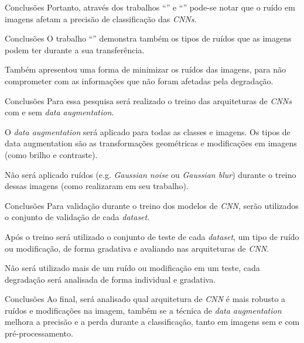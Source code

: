 \begin{frame}{Conclusões}
    Portanto, através dos trabalhos ``\textit{}'' e ``\textit{}'' pode-se notar que o ruído em imagens afetam a precisão de classificação das \textit{CNNs}. 
\end{frame}

\begin{frame}{Conclusões}
    O trabalho ``\textit{}'' demonstra também os tipos de ruídos que as imagens podem ter durante a sua transferência. 
    \vspace{1em}

    Também apresentou uma forma de minimizar os ruídos das imagens, para não comprometer com as informações
que não foram afetadas pela degradação.
\end{frame}

\begin{frame}{Conclusões}
    Para essa pesquisa será realizado o treino das arquiteturas de \textit{CNNs} com e sem \textit{data augmentation}. 
    
    \vspace{1em}
    O \textit{data augmentation} será aplicado para todas as classes e imagens. Os tipos de data augmentation são as transformações geométricas e modificações em imagens (como brilho e contraste). 
    
    \vspace{1em}
    Não será aplicado ruídos (e.g. \textit{Gaussian noise} ou \textit{Gaussian blur}) durante o treino dessas imagens (como \textcite{10.1007/978-3-319-75193-1_50} realizaram em seu trabalho).
\end{frame}

\begin{frame}{Conclusões}
    Para validação durante o treino dos modelos de \textit{CNN}, serão utilizados o conjunto de validação de cada \textit{dataset}. 
    
    \vspace{1em}
    Após o treino será utilizado o conjunto de teste de cada \textit{dataset}, um tipo de ruído ou modificação, de forma gradativa e avaliando nas arquiteturas de \textit{CNN}.
    
    \vspace{1em}
    Não será utilizado mais de um ruído ou modificação em um teste, cada degradação será analisada de forma individual e gradativa.
\end{frame}

\begin{frame}{Conclusões}
    Ao final, será analisado qual arquitetura de \textit{CNN} é mais robusto a ruídos e modificações na imagem, também se a técnica de \textit{data augmentation} melhora a precisão e a perda durante a classificação, tanto em imagens sem e com pré-processamento.
\end{frame}
